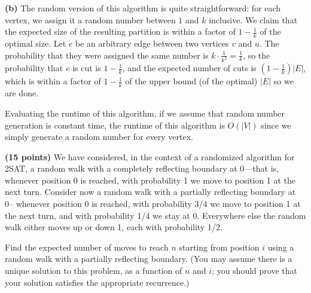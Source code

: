 \documentclass[11pt,letterpaper]{article}
\begin{document}
\begin{solution}
    \textbf{(b)} The random version of this algorithm is quite straightforward: for each vertex, we assign it a random number between $1$ and $k$ inclusive. We claim that the expected size of the resulting partition is within a factor of $1-\frac{1}{k}$ of the optimal size. Let $e$ be an arbitrary edge between two vertices $v$ and $u$. The probability that they were assigned the same number is $k\cdot \frac{1}{k^2}=\frac{1}{k}$, so the probability that $e$ is cut is $1-\frac{1}{k}$, and the expected number of cuts is $\left(1-\frac{1}{k}\right)|E|$, which is within a factor of $1-\frac{1}{k}$ of the upper bound (of the optimal) $|E|$ so we are done. 

    Evaluating the runtime of this algorithm, if we assume that random number generation is constant time, the runtime of this algorithm is $O(|V|)$ since we simply generate a random number for every vertex.
\end{solution} 

\pagebreak
\begin{problem}
    {\bf (15 points)} We have considered, in the context of a randomized algorithm for 2SAT, a random walk with a completely reflecting boundary at 0---that is, whenever position 0 is reached, with probability 1 we move to position 1 at the next turn.  Consider now a random walk with a partially reflecting boundary at 0-- whenever position 0 is reached, with probability 3/4 we move to position 1 at the next turn, and with probability 1/4 we stay at 0.  Everywhere else the random walk either moves up or down 1, each with probability 1/2.

    Find the expected number of moves to reach $n$ starting from position $i$ using a random walk with a partially reflecting boundary. (You may assume there is a unique solution to this problem, as a function of $n$ and $i$; you should prove that your solution satisfies the appropriate recurrence.)
\end{problem}
\end{document}
